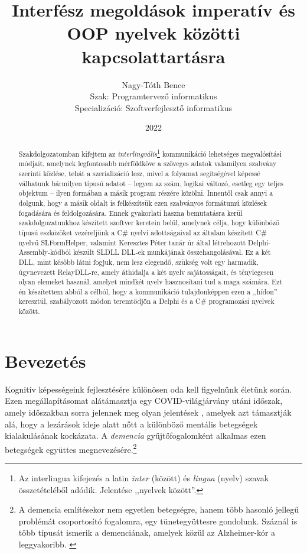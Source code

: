 \documentclass[tocnopagenum]{thesis-ekf}
\theoremstyle{definition}
\theoremstyle{remark}
\begin{document}
	\title{Interfész megoldások imperatív és OOP nyelvek közötti kapcsolattartásra}
	\author{Nagy-Tóth Bence\\Szak: Programtervező informatikus\\Specializáció: Szoftverfejlesztő informatikus}
	\date{2022}
	\maketitle
	\tableofcontents
	\begin{abstract}
		Szakdolgozatomban kifejtem az \textit{interlingvális}\footnote{Az interlingua kifejezés a latin \textit{inter} (között) és \textit{lingua} (nyelv) szavak összetételéből adódik. Jelentése ,,nyelvek között''.} kommunikáció lehetséges megvalósítási módjait, amelynek legfontosabb mérföldköve a szöveges adatok valamilyen szabvány szerinti közlése, tehát a szerializáció lesz, mivel a folyamat segítségével képessé válhatunk bármilyen típusú adatot -- legyen az szám, logikai változó, esetleg egy teljes objektum -- ilyen formában a másik program részére közölni. Innentől csak annyi a dolgunk, hogy a másik oldalt is felkészítsük ezen szabványos formátumú közlések fogadására és feldolgozására. Ennek gyakorlati haszna bemutatásra kerül szakdolgozatunkhoz készített szoftver keretein belül, amelynek célja, hogy különböző típusú eszközöket vezéreljünk a C\# nyelvi adottságaival az általam készített C\# nyelvű SLFormHelper, valamint Keresztes Péter tanár úr által létrehozott Delphi-Assembly-kódból készült SLDLL DLL-ek munkájának összehangolásával. Ez a két DLL, mint később látni fogjuk, nem lesz elegendő, szükség volt egy harmadik, úgynevezett RelayDLL-re, amely áthidalja a két nyelv sajátosságait, és ténylegesen olyan elemeket használ, amelyet mindkét nyelv hasznosítani tud a maga számára. Ezt én készítettem abból a célból, hogy a kommunikáció tulajdonképpen ezen a ,,hídon'' keresztül, szabályozott módon teremtődjön a Delphi és a C\# programozási nyelvek között.
	\end{abstract}
	\chapter*{Bevezetés}
	Kognitív képességeink fejlesztésére különösen oda kell figyelnünk életünk során. Ezen megállapításomat alátámasztja egy COVID-világjárvány utáni időszak, amely időszakban sorra jelennek meg olyan jelentések 
    \cite{brain1}, amelyek azt támasztják alá, hogy a lezárások ideje alatt nőtt a különböző mentális betegségek kialakulásának kockázata. A \textit{demencia} gyűjtőfogalomként alkalmas ezen betegségek együttes megnevezésére.\footnote{A demencia említésekor nem egyetlen betegségre, hanem több hasonló jellegű problémát  csoportosító fogalomra, egy tünetegyüttesre gondolunk. Száznál is több típusát ismerik a demenciának, amelyek közül az Alzheimer-kór a leggyakoribb. \cite{demencia_egeszsegvonal}}
    
\end{document}

